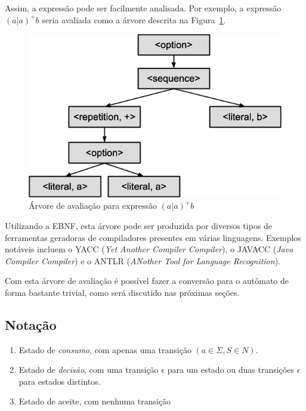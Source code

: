 \documentclass[a4paper,12pt,oneside,onecolumn]{uerj}
\begin{document}
Assim, a expressão pode ser facilmente analisada. Por exemplo, a expressão $(a|a)^+b$ seria avaliada como a árvore descrita na Figura~\ref{fig:aab_parse_tree}.

\begin{figure}[!htbp]
  \centering
  \includegraphics[scale=0.5]{figures/aab_parse_tree.png}
  \caption{Árvore de avaliação para expressão $(a|a)^+b$}
  \label{fig:aab_parse_tree}
\end{figure}

Utilizando a EBNF, esta árvore pode ser produzida por diversos tipos de ferramentas geradoras de compiladores presentes em várias linguagens. Exemplos notáveis incluem o YACC (\emph{Yet Another Compiler Compiler}), o JAVACC (\emph{Java Compiler Compiler}) e o ANTLR (\emph{ANother Tool for Language Recognition}).

Com esta árvore de avaliação é possível fazer a conversão para o autômato de forma bastante trivial, como será discutido nas próximas seções.

\subsection{Notação}
\label{sec:Notacao}

\begin{enumerate}
    \item Estado de \emph{consumo},  com apenas uma transição $(a \in \Sigma, S \in N)$.
    \item Estado de \emph{decisão}, com uma transição $\epsilon$ para um estado ou duas transições $\epsilon$ para estados distintos.
    \item Estado de aceite, com nenhuma transição
\end{enumerate}
\end{document}
